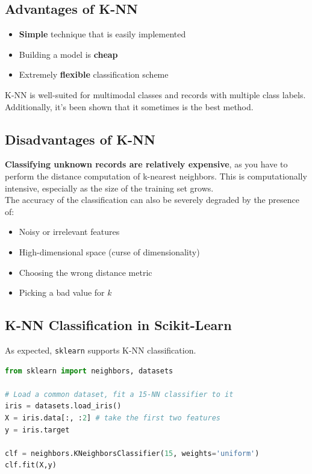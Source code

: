 \documentclass[english, 10pt]{article}
\begin{document}
\subsection{Advantages of K-NN}

\begin{itemize}
	\item \textbf{Simple} technique that is easily implemented
	\item Building a model is \textbf{cheap}
	\item Extremely \textbf{flexible} classification scheme
\end{itemize}

K-NN is well-suited for multimodal classes and records with multiple class labels.\\

Additionally, it's been shown that it sometimes is the best method.

\subsection{Disadvantages of K-NN}

\textbf{Classifying unknown records are relatively expensive}, as you have to perform the distance computation of k-nearest neighbors. This is computationally intensive, especially as the size of the training set grows.\\

The accuracy of the classification can also be severely degraded by the presence of:
\begin{itemize}
	\item Noisy or irrelevant features
	\item High-dimensional space (curse of dimensionality)
	\item Choosing the wrong distance metric
	\item Picking a bad value for $k$
\end{itemize}

\subsection{K-NN Classification in Scikit-Learn}

As expected, \texttt{sklearn} supports K-NN classification.

{\centering
\begin{lstlisting}[language=python]
from sklearn import neighbors, datasets

# Load a common dataset, fit a 15-NN classifier to it
iris = datasets.load_iris()
X = iris.data[:, :2] # take the first two features
y = iris.target

clf = neighbors.KNeighborsClassifier(15, weights='uniform')
clf.fit(X,y)
\end{lstlisting}
}
\end{document}
